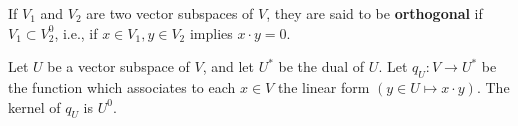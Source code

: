 If $V_1$ and $V_2$ are two vector subspaces of $V$, they are said to be \textbf{orthogonal} if $V_1 \subset V_2^0$, i.e., if $x \in V_1, y \in V_2$ implies $x \cdot y = 0$.

Let $U$ be a vector subspace of $V$, and let $U^*$ be the dual of $U$. Let $q_U: V \to U^*$ be the function which associates to each $x \in V$ the linear form $(y \in U \mapsto x \cdot y)$. The kernel of $q_U$ is $U^0$.

